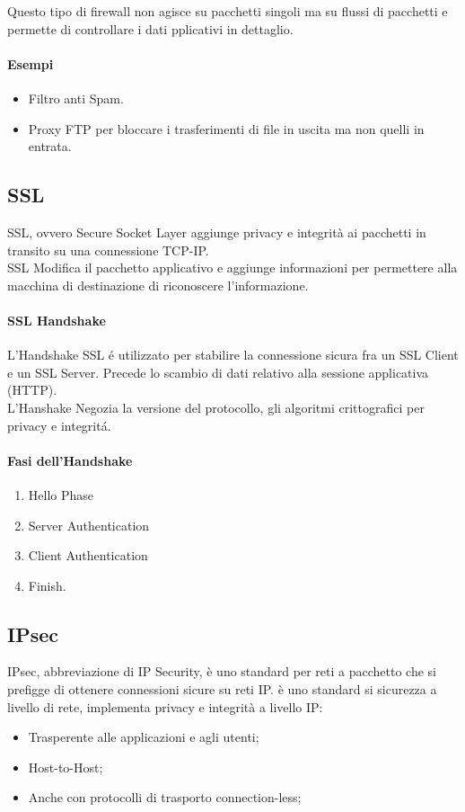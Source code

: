 \documentclass[12pt, a4paper, openany]{book}
\begin{document}
Questo tipo di firewall non agisce su pacchetti singoli ma su flussi di pacchetti e permette di controllare i dati pplicativi in dettaglio.

\paragraph*{Esempi}
\begin{itemize}
    \item Filtro anti Spam.
    \item Proxy FTP per bloccare i trasferimenti di file in uscita ma non quelli in entrata.
\end{itemize}

\subsection{SSL}
SSL, ovvero Secure Socket Layer aggiunge privacy e integrità ai pacchetti in transito su una connessione TCP-IP.
\\SSL Modifica il pacchetto applicativo e aggiunge informazioni per permettere alla macchina di destinazione di riconoscere l'informazione.

\paragraph{SSL Handshake}
L'Handshake SSL é utilizzato per stabilire la connessione sicura fra un SSL Client e un SSL Server.
Precede lo scambio di dati relativo alla sessione applicativa (HTTP).
\\L'Hanshake Negozia la versione del protocollo, gli algoritmi crittografici per privacy e integritá.

\paragraph{Fasi dell'Handshake}
\begin{enumerate}
    \item Hello Phase
    \item Server Authentication
    \item Client Authentication
    \item Finish.
\end{enumerate}

\subsection{IPsec}
IPsec, abbreviazione di IP Security, è uno standard per reti a pacchetto che si prefigge di ottenere connessioni sicure su reti IP.
è uno standard si sicurezza a livello di rete, implementa privacy e integrità a livello IP:
\begin{itemize}
    \item Trasperente alle applicazioni e agli utenti;
    \item Host-to-Host;
    \item Anche con protocolli di trasporto connection-less;
\end{itemize}
\end{document}

